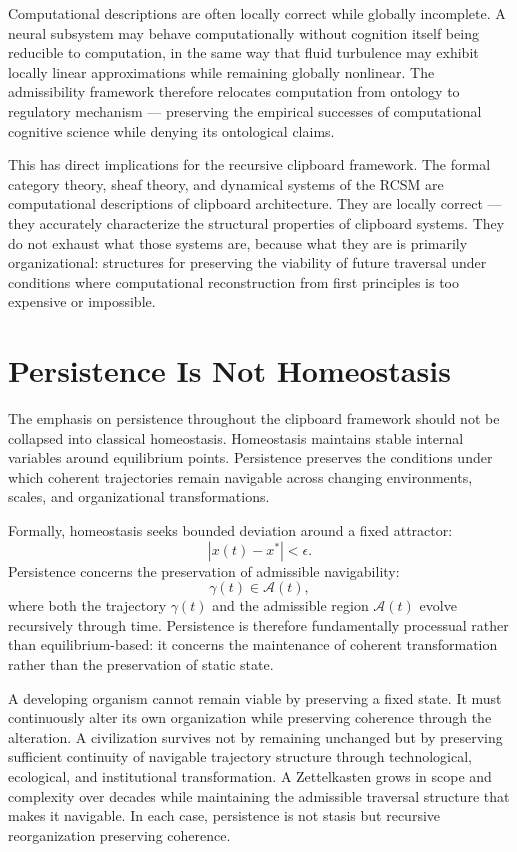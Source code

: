 \documentclass[12pt,oneside]{book}
\theoremstyle{plain}
\theoremstyle{definition}
\theoremstyle{plain}
\begin{document}
Computational descriptions are often locally correct while globally incomplete. A neural subsystem may behave computationally without cognition itself being reducible to computation, in the same way that fluid turbulence may exhibit locally linear approximations while remaining globally nonlinear. The admissibility framework therefore relocates computation from ontology to regulatory mechanism — preserving the empirical successes of computational cognitive science while denying its ontological claims.

This has direct implications for the recursive clipboard framework. The formal category theory, sheaf theory, and dynamical systems of the RCSM are computational descriptions of clipboard architecture. They are locally correct — they accurately characterize the structural properties of clipboard systems. They do not exhaust what those systems are, because what they are is primarily organizational: structures for preserving the viability of future traversal under conditions where computational reconstruction from first principles is too expensive or impossible.

\section{Persistence Is Not Homeostasis}

The emphasis on persistence throughout the clipboard framework should not be collapsed into classical homeostasis. Homeostasis maintains stable internal variables around equilibrium points. Persistence preserves the conditions under which coherent trajectories remain navigable across changing environments, scales, and organizational transformations.

Formally, homeostasis seeks bounded deviation around a fixed attractor:
\[
|x(t) - x^*| < \epsilon.
\]
Persistence concerns the preservation of admissible navigability:
\[
\gamma(t) \in \mathcal{A}(t),
\]
where both the trajectory $\gamma(t)$ and the admissible region $\mathcal{A}(t)$ evolve recursively through time. Persistence is therefore fundamentally processual rather than equilibrium-based: it concerns the maintenance of coherent transformation rather than the preservation of static state.

A developing organism cannot remain viable by preserving a fixed state. It must continuously alter its own organization while preserving coherence through the alteration. A civilization survives not by remaining unchanged but by preserving sufficient continuity of navigable trajectory structure through technological, ecological, and institutional transformation. A Zettelkasten grows in scope and complexity over decades while maintaining the admissible traversal structure that makes it navigable. In each case, persistence is not stasis but recursive reorganization preserving coherence.
\end{document}
